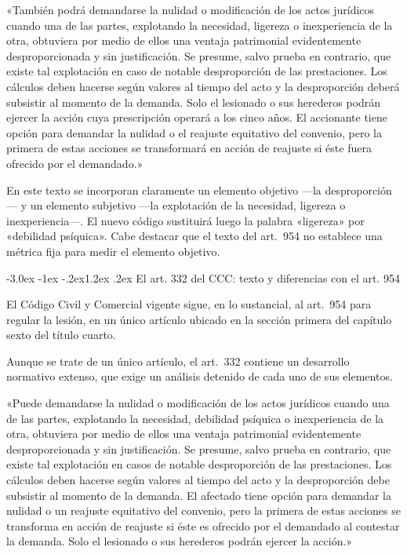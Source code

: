 \documentclass[12pt,oneside]{book}
\makeatletter
\renewcommand\section{\@startsection{section}{1}{\z@}%
  {-3.0ex \@plus -1ex \@minus -.2ex}{1.2ex \@plus .2ex}%
  {\normalfont\large\bfseries\color{acento}}}
\makeatother
\begin{document}
\begin{regla}
«También podrá demandarse la nulidad o modificación de los actos jurídicos cuando una de las partes, explotando la necesidad, ligereza o inexperiencia de la otra, obtuviera por medio de ellos una ventaja patrimonial evidentemente desproporcionada y sin justificación. Se presume, salvo prueba en contrario, que existe tal explotación en caso de notable desproporción de las prestaciones. Los cálculos deben hacerse según valores al tiempo del acto y la desproporción deberá subsistir al momento de la demanda. Solo el lesionado o sus herederos podrán ejercer la acción cuya prescripción operará a los cinco años. El accionante tiene opción para demandar la nulidad o el reajuste equitativo del convenio, pero la primera de estas acciones se transformará en acción de reajuste si éste fuera ofrecido por el demandado.»
\end{regla}

En este texto se incorporan claramente un elemento objetivo ---la desproporción--- y un elemento subjetivo ---la explotación de la necesidad, ligereza o inexperiencia---. El nuevo código sustituirá luego la palabra «ligereza» por «debilidad psíquica». Cabe destacar que el texto del art.\ 954 no establece una métrica fija para medir el elemento objetivo.

\section{El art. 332 del CCC: texto y diferencias con el art. 954}

El Código Civil y Comercial vigente sigue, en lo sustancial, al art.\ 954 para regular la lesión, en un único artículo ubicado en la sección primera del capítulo sexto del título cuarto.

\begin{importante}
Aunque se trate de un único artículo, el art.\ 332 contiene un desarrollo normativo extenso, que exige un análisis detenido de cada uno de sus elementos.
\end{importante}

\begin{regla}
«Puede demandarse la nulidad o modificación de los actos jurídicos cuando una de las partes, explotando la necesidad, debilidad psíquica o inexperiencia de la otra, obtuviera por medio de ellos una ventaja patrimonial evidentemente desproporcionada y sin justificación. Se presume, salvo prueba en contrario, que existe tal explotación en casos de notable desproporción de las prestaciones. Los cálculos deben hacerse según valores al tiempo del acto y la desproporción debe subsistir al momento de la demanda. El afectado tiene opción para demandar la nulidad o un reajuste equitativo del convenio, pero la primera de estas acciones se transforma en acción de reajuste si éste es ofrecido por el demandado al contestar la demanda. Solo el lesionado o sus herederos podrán ejercer la acción.»
\end{regla}
\end{document}
